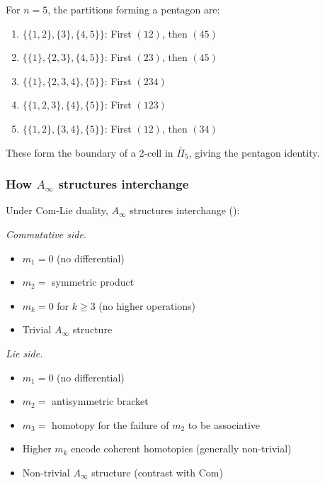 \begin{example}
For $n=5$, the partitions forming a pentagon are:
\begin{enumerate}
\item $\{\{1,2\},\{3\},\{4,5\}\}$: First $(12)$, then $(45)$
\item $\{\{1\},\{2,3\},\{4,5\}\}$: First $(23)$, then $(45)$
\item $\{\{1\},\{2,3,4\},\{5\}\}$: First $(234)$
\item $\{\{1,2,3\},\{4\},\{5\}\}$: First $(123)$
\item $\{\{1,2\},\{3,4\},\{5\}\}$: First $(12)$, then $(34)$
\end{enumerate}

These form the boundary of a 2-cell in $\bar{\Pi}_5$, giving the pentagon identity.
\end{example}

\subsubsection{\texorpdfstring{How $A_\infty$ structures interchange}{How A-infinity structures interchange}}

\begin{theorem}\label{thm:ainfty-com-lie-interchange}
Under Com-Lie duality, $A_\infty$ structures interchange
\textup{(}\cite[Theorem~7.4.1]{LV12}\textup{)}:

\emph{Commutative side.}
\begin{itemize}
\item $m_1 = 0$ (no differential)
\item $m_2 = $ symmetric product
\item $m_k = 0$ for $k \geq 3$ (no higher operations)
\item Trivial $A_\infty$ structure
\end{itemize}

\emph{Lie side.}
\begin{itemize}
\item $m_1 = 0$ (no differential)
\item $m_2 = $ antisymmetric bracket
\item $m_3 = $ homotopy for the failure of $m_2$ to be associative
\item Higher $m_k$ encode coherent homotopies (generally non-trivial)
\item Non-trivial $A_\infty$ structure (contrast with Com)
\end{itemize}
\end{theorem}

